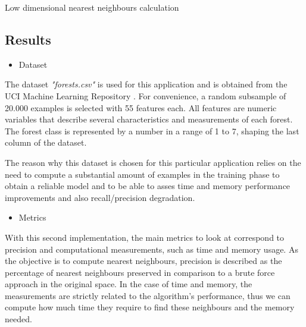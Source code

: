 \documentclass[a4paper,11pt,spanish]{report}
\makeatletter
\def\BState{\State\hskip-\ALG@thistlm}
\makeatother
\begin{document}
\begin{algorithm}
\caption{Low dimensional nearest neighbours calculation}
\label{alg3}
\end{algorithm}

\subsection{Results}
\label{ssec:res2}

\begin{itemize}
    \item Dataset
\end{itemize}

The dataset \textit{"forests.csv"} is used for this application and is obtained from the UCI Machine Learning Repository \citep{ucidata}. For convenience, a random subsample of 20.000 examples is selected with 55 features each. All features are numeric variables that describe several characteristics and measurements of each forest. The forest class is represented by a number in a range of 1 to 7, shaping the last column of the dataset.

The reason why this dataset is chosen for this particular application relies on the need to compute a substantial amount of examples in the training phase to obtain a reliable model and to be able to asses time and memory performance improvements and also recall/precision degradation.

\begin{itemize}
    \item Metrics
\end{itemize}

With this second implementation, the main metrics to look at correspond to precision and computational measurements, such as time and memory usage. As the objective is to compute nearest neighbours, precision is described as the percentage of nearest neighbours preserved in comparison to a brute force approach in the original space. In the case of time and memory, the measurements are strictly related to the algorithm's performance, thus we can compute how much time they require to find these neighbours and the memory needed.
\end{document}
